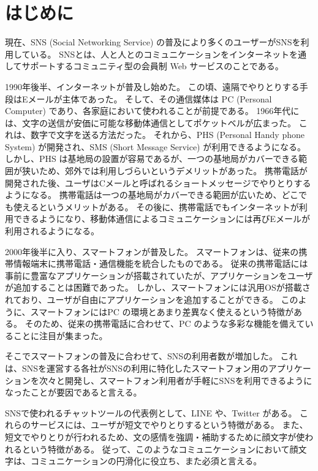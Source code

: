 \documentclass[11pt,a4j]{jsarticle}
\begin{document}
\section{はじめに}\label{sec:begin}
現在、SNS (Social Networking Service) の普及により多くのユーザーがSNSを利用している。
SNSとは、人と人とのコミュニケーションをインターネットを通してサポートするコミュニティ型の会員制 Web サービスのことである。

1990年後半、インターネットが普及し始めた。
この頃、遠隔でやりとりする手段はEメールが主体であった。
そして、その通信媒体は PC (Personal Computer) であり、各家庭において使われることが前提である。
1966年代には、文字の送信が安価に可能な移動体通信としてポケットベルが広まった。
これは、数字で文字を送る方法だった。
それから、PHS (Personal Handy phone System) が開発され、SMS (Short Message Service) が利用できるようになる。
しかし、PHS は基地局の設置が容易であるが、一つの基地局がカバーできる範囲が狭いため、郊外では利用しづらいというデメリットがあった。
携帯電話が開発された後、ユーザはCメールと呼ばれるショートメッセージでやりとりするようになる。
携帯電話は一つの基地局がカバーできる範囲が広いため、どこでも使えるというメリットがある。
その後に、携帯電話でもインターネットが利用できるようになり、移動体通信によるコミュニケーションには再びEメールが利用されるようになる。

2000年後半に入り、スマートフォンが普及した。
スマートフォンは、従来の携帯情報端末に携帯電話・通信機能を統合したものである。
従来の携帯電話には事前に豊富なアプリケーションが搭載されていたが、アプリケーションをユーザが追加することは困難であった。
しかし、スマートフォンには汎用OSが搭載されており、ユーザが自由にアプリケーションを追加することができる。
このように、スマートフォンにはPC の環境とあまり差異なく使えるという特徴がある。
そのため、従来の携帯電話に合わせて、PC のような多彩な機能を備えていることに注目が集まった。

そこでスマートフォンの普及に合わせて、SNSの利用者数が増加した。
これは、SNSを運営する各社がSNSの利用に特化したスマートフォン用のアプリケーションを次々と開発し、スマートフォン利用者が手軽にSNSを利用できるようになったことが要因であると言える。

SNSで使われるチャットツールの代表例として、LINE\raisebox{.5zw}{\scalebox{.5}{\textregistered}} や、Twitter\raisebox{.5zw}{\scalebox{.5}{\textregistered}} がある。
これらのサービスには、ユーザが短文でやりとりするという特徴がある。
また、短文でやりとりが行われるため、文の感情を強調・補助するために顔文字が使われるという特徴がある。
従って、このようなコミュニケーションにおいて顔文字は、コミュニケーションの円滑化に役立ち、また必須と言える。
\end{document}
